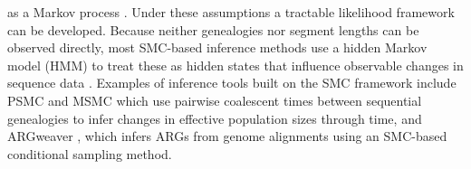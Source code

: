 \documentclass[11pt]{article}
\begin{document}
as a Markov process \citep{mcvean2005approximating}. 
Under these assumptions a tractable likelihood framework can be developed. 
% 
% 
Because neither genealogies nor segment lengths can
be observed directly, most SMC-based inference methods use 
a hidden Markov model (HMM) to treat these as hidden states 
that influence observable changes in sequence data \citep{spence_inference_2018}.
Examples of inference tools built on the SMC framework include 
PSMC \citep{li2011inference} and MSMC \citep{schiffels_inferring_2014}
which use pairwise coalescent times between sequential genealogies
to infer changes in effective population sizes through time, 
and ARGweaver \citep{rasmussen2014genome, hubisz2020inference}, 
which infers ARGs from genome alignments using an SMC-based 
conditional sampling method.
\end{document}
